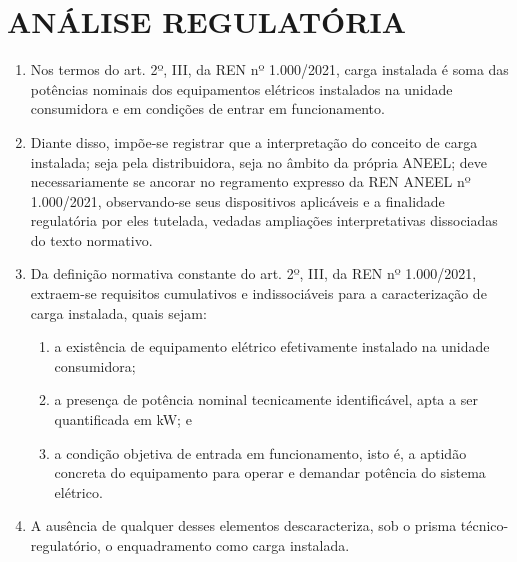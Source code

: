 \section{ANÁLISE REGULATÓRIA}

\begin{enumerate}[resume]
    \item Nos termos do art. 2º, III, da REN nº 1.000/2021, carga instalada é soma das potências nominais dos equipamentos elétricos instalados na unidade consumidora e em condições de entrar em funcionamento.


    \item Diante disso, impõe-se registrar que a interpretação do conceito de carga instalada; seja pela distribuidora, seja no âmbito da própria ANEEL; deve necessariamente se ancorar no regramento expresso da REN ANEEL nº 1.000/2021, observando-se seus dispositivos aplicáveis e a finalidade regulatória por eles tutelada, vedadas ampliações interpretativas dissociadas do texto normativo.

    \item Da definição normativa constante do art. 2º, III, da REN nº 1.000/2021, extraem-se requisitos cumulativos e indissociáveis para a caracterização de carga instalada, quais sejam:

    \begin{enumerate}
        \item a existência de equipamento elétrico efetivamente instalado na unidade consumidora;

        \item a presença de potência nominal tecnicamente identificável, apta a ser quantificada em kW; e

        \item a condição objetiva de entrada em funcionamento, isto é, a aptidão concreta do equipamento para operar e demandar potência do sistema elétrico.
    \end{enumerate}

    \item A ausência de qualquer desses elementos descaracteriza, sob o prisma técnico-regulatório, o enquadramento como carga instalada.


\end{enumerate}
